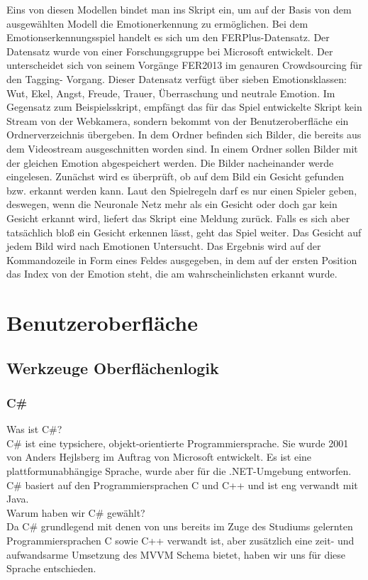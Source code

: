 \documentclass[12pt,a4paper,headinclude,twoside, plainheadsepline, open=right,numbers=noenddot]{scrreprt}
\begin{document}
Eins von diesen Modellen bindet man ins Skript ein, um auf der Basis von
dem ausgewählten Modell die Emotionerkennung zu ermöglichen. Bei dem Emotionserkennungsspiel
handelt es sich um den FERPlus-Datensatz. 
 \cite{LeweOhlsen} Der Datensatz wurde
von einer Forschungsgruppe bei Microsoft entwickelt. Der unterscheidet sich
von seinem Vorgänge FER2013 im genauren Crowdsourcing für den Tagging-
Vorgang.
 \cite{RamakrishnanPandeyKarmakarSaha} 
Dieser Datensatz verfügt über sieben Emotionsklassen: Wut, Ekel,
Angst, Freude, Trauer, Überraschung und neutrale Emotion.\newline
Im Gegensatz zum Beispielsskript, empfängt das für das Spiel entwickelte Skript 
kein Stream von der Webkamera, sondern bekommt von der Benutzeroberfläche
ein Ordnerverzeichnis übergeben. In dem Ordner befinden sich Bilder, die bereits
aus dem Videostream ausgeschnitten worden sind. In einem Ordner sollen Bilder
mit der gleichen Emotion abgespeichert werden. Die Bilder nacheinander werde
eingelesen.
 \newline
Zunächst wird es überprüft, ob auf dem Bild ein Gesicht gefunden bzw.
erkannt werden kann. Laut den Spielregeln darf es nur einen Spieler geben,
deswegen, wenn die Neuronale Netz mehr als ein Gesicht oder doch gar kein
Gesicht erkannt wird, liefert das Skript eine Meldung zurück. Falls es sich aber
tatsächlich bloß ein Gesicht erkennen lässt, geht das Spiel weiter. Das Gesicht auf
jedem Bild wird nach Emotionen Untersucht. Das Ergebnis wird auf der Kommandozeile
in Form eines Feldes ausgegeben, in dem auf der ersten Position das
Index von der Emotion steht, die am wahrscheinlichsten erkannt wurde.


\section{Benutzeroberfläche}

\subsection{Werkzeuge Oberflächenlogik} %
\subsubsection{C\#}
Was ist C\#? \\
C\# ist eine typsichere, objekt-orientierte Programmiersprache. Sie wurde 2001 von Anders Hejlsberg im Auftrag von Microsoft entwickelt. Es ist eine plattformunabhängige Sprache, wurde aber für die .NET-Umgebung entworfen. C\# basiert auf den Programmiersprachen C und C++ und ist eng verwandt mit Java\cite{Shildt2010}.\\
Warum haben wir C\# gewählt? \\
Da C\# grundlegend mit denen von uns bereits im Zuge des Studiums gelernten Programmiersprachen C sowie C++ verwandt ist, aber zusätzlich eine zeit- und aufwandsarme Umsetzung des MVVM Schema bietet, haben wir uns für diese Sprache entschieden.
\end{document}
